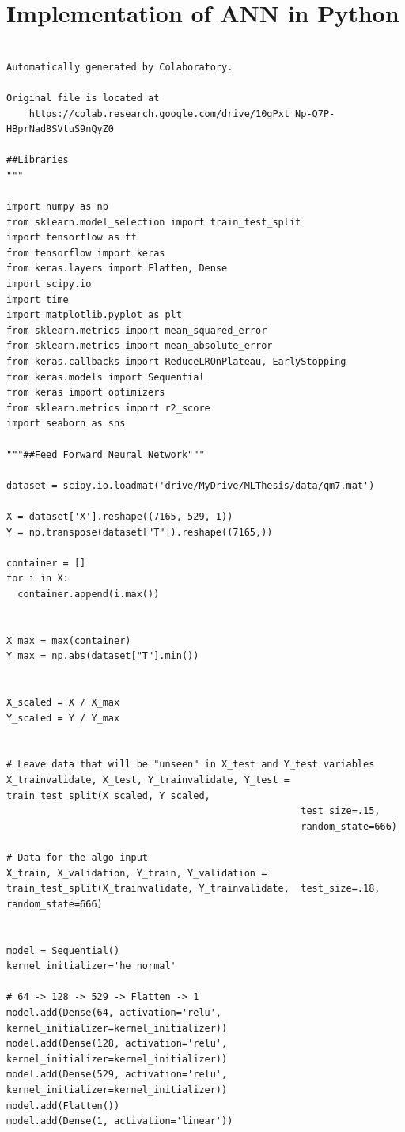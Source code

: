 \documentclass[a4paper,oneside,openright,11pt]{book}
\begin{document}
\appendix
\appendixpage
\addappheadtotoc
\chapter{Implementation of ANN in Python}



\begin{verbatim}

Automatically generated by Colaboratory.

Original file is located at
    https://colab.research.google.com/drive/10gPxt_Np-Q7P-HBprNad8SVtuS9nQyZ0

##Libraries
"""

import numpy as np
from sklearn.model_selection import train_test_split
import tensorflow as tf
from tensorflow import keras
from keras.layers import Flatten, Dense
import scipy.io
import time
import matplotlib.pyplot as plt
from sklearn.metrics import mean_squared_error
from sklearn.metrics import mean_absolute_error
from keras.callbacks import ReduceLROnPlateau, EarlyStopping
from keras.models import Sequential
from keras import optimizers
from sklearn.metrics import r2_score
import seaborn as sns

"""##Feed Forward Neural Network"""

dataset = scipy.io.loadmat('drive/MyDrive/MLThesis/data/qm7.mat')

X = dataset['X'].reshape((7165, 529, 1)) 
Y = np.transpose(dataset["T"]).reshape((7165,))

container = []
for i in X:
  container.append(i.max())
  

X_max = max(container)
Y_max = np.abs(dataset["T"].min())


X_scaled = X / X_max
Y_scaled = Y / Y_max


# Leave data that will be "unseen" in X_test and Y_test variables
X_trainvalidate, X_test, Y_trainvalidate, Y_test = train_test_split(X_scaled, Y_scaled,  
                                                    test_size=.15, 
                                                    random_state=666)

# Data for the algo input
X_train, X_validation, Y_train, Y_validation = train_test_split(X_trainvalidate, Y_trainvalidate,  test_size=.18, random_state=666)


model = Sequential()
kernel_initializer='he_normal'

# 64 -> 128 -> 529 -> Flatten -> 1
model.add(Dense(64, activation='relu', kernel_initializer=kernel_initializer))
model.add(Dense(128, activation='relu', kernel_initializer=kernel_initializer))
model.add(Dense(529, activation='relu', kernel_initializer=kernel_initializer))
model.add(Flatten())
model.add(Dense(1, activation='linear'))



\end{verbatim}
\end{document}
